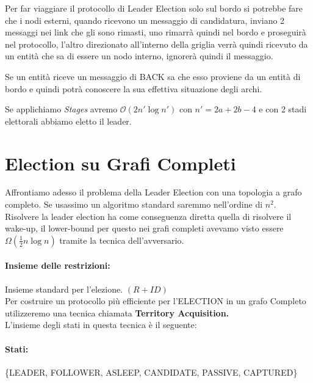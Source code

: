 Per far viaggiare il protocollo di Leader Election solo sul bordo si potrebbe
fare che i nodi esterni, quando ricevono un messaggio di candidatura, inviano 2
messaggi nei link che gli sono rimasti, uno rimarrà quindi nel bordo e proseguirà nel
protocollo, l'altro direzionato all'interno della griglia verrà quindi ricevuto
da un entità che sa di essere un nodo interno, ignorerà quindi il messaggio.

Se un entità riceve un messaggio di BACK sa che esso proviene da un entità di
bordo e quindi potrà conoscere la sua effettiva situazione degli archi.

Se applichiamo \emph{Stages} avremo $\mathcal{O}(2n' \log n')$ con $n' = 2a + 2b
    - 4$ e con 2 stadi elettorali abbiamo eletto il leader.

\section{Election su Grafi Completi}
Affrontiamo adesso il problema della Leader Election con una topologia a grafo
completo. Se usassimo un algoritmo standard saremmo nell'ordine di $n^2$.
Risolvere la leader election ha come conseguenza diretta quella di risolvere il
wake-up, il lower-bound per questo nei grafi completi avevamo visto essere
$\Omega(\frac{1}{2}n \log n)$ tramite la tecnica dell'avversario.

\paragraph{Insieme delle restrizioni:} Insieme standard per l'elezione. $(R+ID)$\\
Per costruire un protocollo più efficiente per l'ELECTION in un grafo Completo
utilizzeremo una tecnica chiamata \textbf{Territory Acquisition.}\\
L'insieme degli stati in questa tecnica è il seguente:

\paragraph{Stati:} \{LEADER, FOLLOWER, ASLEEP, CANDIDATE, PASSIVE, CAPTURED\}

